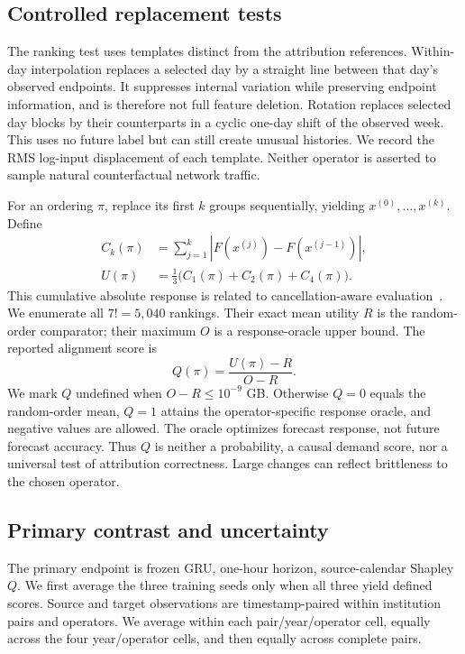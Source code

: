 \documentclass[conference]{IEEEtran}
\begin{document}
\subsection{Controlled replacement tests}
The ranking test uses templates distinct from the attribution references. Within-day interpolation replaces a selected day by a straight line between that day's observed endpoints. It suppresses internal variation while preserving endpoint information, and is therefore not full feature deletion. Rotation replaces selected day blocks by their counterparts in a cyclic one-day shift of the observed week. This uses no future label but can still create unusual histories. We record the RMS log-input displacement of each template. Neither operator is asserted to sample natural counterfactual network traffic.

For an ordering $\pi$, replace its first $k$ groups sequentially, yielding $x^{(0)},\ldots,x^{(k)}$. Define
\begin{align}
C_k(\pi)&=\sum_{j=1}^{k}|F(x^{(j)})-F(x^{(j-1)})|,\\
U(\pi)&=\tfrac13\big(C_1(\pi)+C_2(\pi)+C_4(\pi)\big).
\end{align}
This cumulative absolute response is related to cancellation-aware evaluation~\cite{timing}. We enumerate all $7!=5,040$ rankings. Their exact mean utility $R$ is the random-order comparator; their maximum $O$ is a response-oracle upper bound. The reported alignment score is
\begin{equation}
Q(\pi)=\frac{U(\pi)-R}{O-R}.
\end{equation}
We mark $Q$ undefined when $O-R\leq10^{-9}$ GB. Otherwise $Q=0$ equals the random-order mean, $Q=1$ attains the operator-specific response oracle, and negative values are allowed. The oracle optimizes forecast response, not future forecast accuracy. Thus $Q$ is neither a probability, a causal demand score, nor a universal test of attribution correctness. Large changes can reflect brittleness to the chosen operator.

\subsection{Primary contrast and uncertainty}
The primary endpoint is frozen GRU, one-hour horizon, source-calendar Shapley $Q$. We first average the three training seeds only when all three yield defined scores. Source and target observations are timestamp-paired within institution pairs and operators. We average within each pair/year/operator cell, equally across the four year/operator cells, and then equally across complete pairs.
\end{document}

